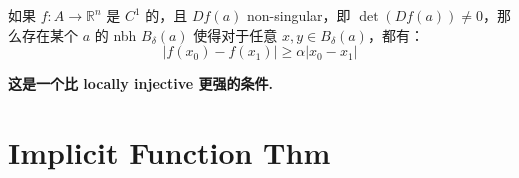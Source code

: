 \begin{lemma}
    如果 $f: A \rightarrow \mathbb{R}^n$ 是 $C^1$ 的，且 $Df(a)$ non-singular，即 $\det(Df(a)) \not = 0$，那么存在某个 $a$ 的 nbh $B_{\delta} (a)$ 使得对于任意 $x,y \in B_{\delta}(a)$，都有：
    $$
    |f(x_0) - f(x_1)| \geq \alpha |x_0 - x_1|
    $$
\end{lemma}
\begin{note}
 \textbf{这是一个比 locally injective 更强的条件.}
\end{note}







\section{Implicit Function Thm}












